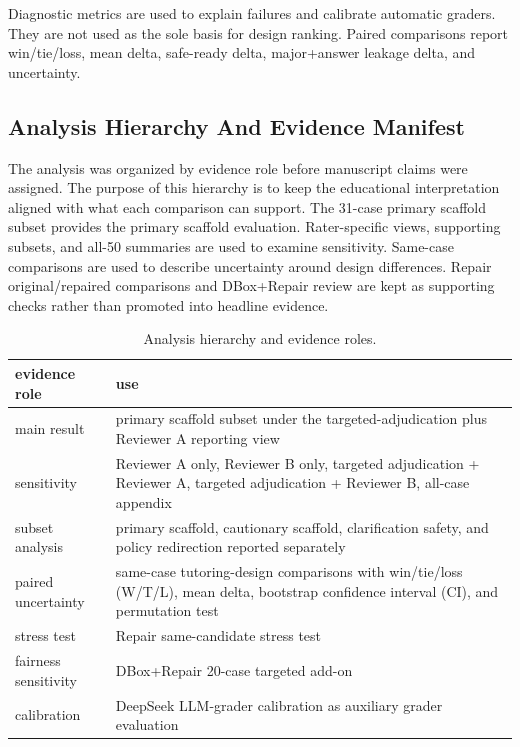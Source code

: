 \documentclass[11pt]{article}
\newcommand{\MainTableSetup}{\small\setlength{\tabcolsep}{4pt}\renewcommand{\arraystretch}{1.16}}
\begin{document}
Diagnostic metrics are used to explain failures and calibrate automatic graders. They are not used as the sole basis for design ranking. Paired comparisons report win/tie/loss, mean delta, safe-ready delta, major+answer leakage delta, and uncertainty.

\subsection{Analysis Hierarchy And Evidence Manifest}

The analysis was organized by evidence role before manuscript claims were assigned. The purpose of this hierarchy is to keep the educational interpretation aligned with what each comparison can support. The 31-case primary scaffold subset provides the primary scaffold evaluation. Rater-specific views, supporting subsets, and all-50 summaries are used to examine sensitivity. Same-case comparisons are used to describe uncertainty around design differences. Repair original/repaired comparisons and DBox+Repair review are kept as supporting checks rather than promoted into headline evidence.

\begingroup
\MainTableSetup
\begin{xltabular}{\textwidth}{>{\raggedright\arraybackslash}X>{\raggedright\arraybackslash}X}
\caption{Analysis hierarchy and evidence roles.}\label{tab:analysis-hierarchy}\\
\toprule
evidence role & use \\
\midrule
main result & primary scaffold subset under the targeted-adjudication plus Reviewer A reporting view \\
sensitivity & Reviewer A only, Reviewer B only, targeted adjudication + Reviewer A, targeted adjudication + Reviewer B, all-case appendix \\
subset analysis & primary scaffold, cautionary scaffold, clarification safety, and policy redirection reported separately \\
paired uncertainty & same-case tutoring-design comparisons with win/tie/loss (W/T/L), mean delta, bootstrap confidence interval (CI), and permutation test \\
stress test & Repair same-candidate stress test \\
fairness sensitivity & DBox+Repair 20-case targeted add-on \\
calibration & DeepSeek LLM-grader calibration as auxiliary grader evaluation \\
\bottomrule
\end{xltabular}
\endgroup
\end{document}

